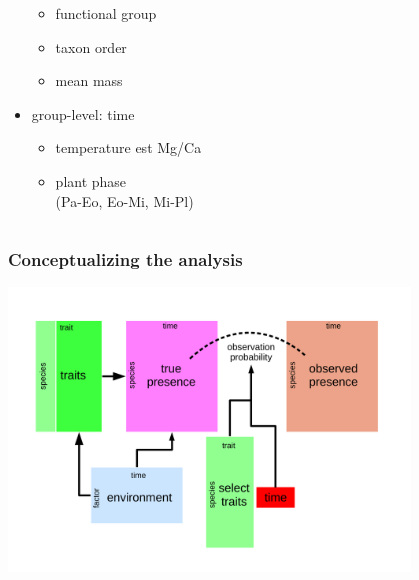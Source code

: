 \documentclass[aspectratio=169]{beamer}
\begin{document}
\begin{frame}
\begin{columns}
\begin{column}[T]{0.3\textwidth}
\begin{itemize}
          \begin{itemize}
            \item functional group
            \item taxon order
            \item mean mass
          \end{itemize}
        \item group-level: time
          \begin{itemize}
            \item temperature est Mg/Ca
            \item plant phase \\(Pa-Eo, Eo-Mi, Mi-Pl)
          \end{itemize}
      \end{itemize}
    \end{column}
  \end{columns}

\end{frame}

\begin{frame}
  \frametitle{Conceptualizing the analysis}
  \begin{center}
    \includegraphics[width=0.8\textwidth,height=\textheight,keepaspectratio=true]{figure/paleo_fourth_corner}
  \end{center}
\end{frame}
\end{document}
